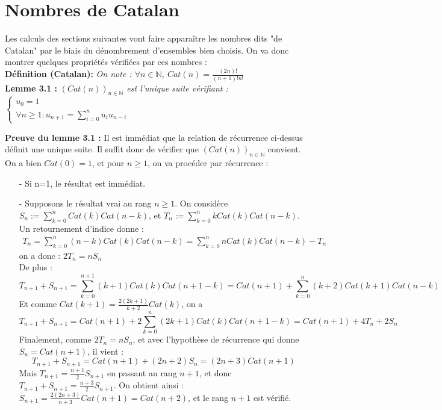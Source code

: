 \documentclass[10pt,a4paper]{article}
\begin{document}
\section{Nombres de Catalan}

Les calculs des sections suivantes vont faire apparaître les nombres dits "de Catalan" par le biais du dénombrement d'ensembles bien choisis. On va donc montrer quelques propriétés vérifiées par ces nombres :\\

\textbf{Définition (Catalan):} \textit{ On note : $\forall n \in \mathbb{N}$, $Cat(n)=\frac{(2n)!}{(n+1)!n!}$ }\\

\textbf{Lemme 3.1 :}\textit{ $(Cat(n))_{n \in \mathbb{N}}$ est l'unique suite vérifiant : $\begin{cases} u_0=1 \\ \forall n \geq 1 : u_{n+1} = \sum_{i=0}^{n} u_iu_{n-i} \end{cases}$\\
}

\textbf{Preuve du lemme 3.1 :} Il est immédiat que la relation de récurrence ci-dessus définit une unique suite. Il suffit donc de vérifier que  $(Cat(n))_{n \in \mathbb{N}}$ convient. On a bien $Cat(0)=1$, et pour $n \geq 1$, on va procéder par récurrence :
\begin{itemize}
\item[-] Si n=1, le résultat est immédiat. 
\item[-] Supposons le résultat vrai au rang $n \geq 1$. On considère $S_n :=\sum_{k=0}^{n} Cat(k)Cat(n-k)$, et $T_n :=\sum_{k=0}^{n} kCat(k)Cat(n-k)$. Un retournement d'indice donne : 
\begin{eqnarray*} 
T_n =\sum_{k=0}^{n} (n-k)Cat(k)Cat(n-k)= \sum_{k=0}^{n} nCat(k)Cat(n-k) - T_n \end{eqnarray*}
 on a donc : $2T_n=nS_n$ \\
De plus :  \[T_{n+1} + S_{n+1} = \sum_{k=0}^{n+1}(k+1)Cat(k)Cat(n+1-k) = Cat(n+1) + \sum_{k=0}^{n}(k+2)Cat(k+1)Cat(n-k)\]   Et comme $Cat(k+1)=\frac{2(2k+1)}{k+2}Cat(k)$, on a \[T_{n+1} + S_{n+1} = Cat(n+1) + 2\sum_{k=0}^{n}(2k+1)Cat(k)Cat(n+1-k) = Cat(n+1) + 4T_n + 2S_n \]
Finalement, comme $2T_n=nS_n$, et avec l'hypothèse de récurrence qui donne $S_n=Cat(n+1)$, il vient : \[T_{n+1} + S_{n+1} = Cat(n+1) + (2n+2)S_n=(2n+3)Cat(n+1)\]
Mais $T_{n+1}=\frac{n+1}{2}S_{n+1}$ en passant au rang $n+1$, et donc $T_{n+1} + S_{n+1}=\frac{n+3}{2}S_{n+1}$. On obtient ainsi : $S_{n+1}=\frac{2(2n+3)}{n+3}Cat(n+1)=Cat(n+2)$, et le rang $n+1$ est vérifié.\\

  
\end{itemize}
\end{document}
